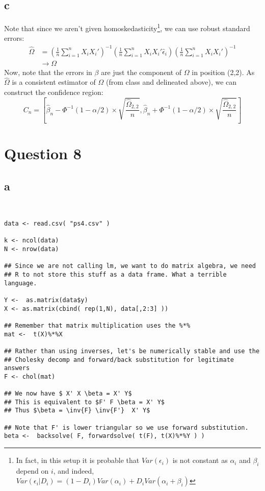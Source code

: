\documentclass[12pt]{paper}
\begin{document}
\subsection*{c}
Note that since we aren't given homoskedasticity\footnote{In fact, in this setup it is probable that $Var(\epsilon_i)$ is not constant as $\alpha_i$ and $\beta_i$ depend on $i$, and indeed, $Var(\epsilon_i|D_i) = (1-D_i)Var(\alpha_i) + D_iVar(\alpha_i + \beta_i)$}, we can use robust standard errors:
\begin{align*}
    \hat \Omega &= (\frac{1}{n}\sum_{i=1}^n X_i X_i')^{-1}(\frac{1}{n}\sum_{i=1}^n X_i X_i' \hat \epsilon_i)(\frac{1}{n}\sum_{i=1}^n X_i X_i')^{-1} \\
    & \rightarrow \Omega
\end{align*}
Now, note that the errors in $\beta$ are just the component of $\Omega$ in position (2,2). As $\hat \Omega$ is a consistent estimator of $\Omega$ (from class and delineated above), we can construct the confidence region:
$$C_n = [\hat \beta_n - \Phi^{-1}({1-\alpha/2})\times \sqrt{\frac{\hat \Omega_{2,2}}{n}}, \hat \beta_n +  \Phi^{-1}({1-\alpha/2})\times \sqrt{\frac{\hat \Omega_{2,2}}{n}}]  $$



\section*{Question 8}

\subsection*{a}

\begin{verbatim}


data <- read.csv( "ps4.csv" )

k <- ncol(data)
N <- nrow(data)

## Since we are not calling lm, we want to do matrix algebra, we need
## R to not store this stuff as a data frame. What a terrible language.

Y <-  as.matrix(data$y)
X <- as.matrix(cbind( rep(1,N), data[,2:3] ))

## Remember that matrix multiplication uses the %*%
mat <-  t(X)%*%X

## Rather than using inverses, let's be numerically stable and use the
## Cholesky decomp and forward/back substitution for legitimate answers
F <- chol(mat)

## We now have $ X' X \beta = X' Y$
## This is equivalent to $F' F \beta = X' Y$
## Thus $\beta = \inv{F} \inv{F'}  X' Y$

## Note that F' is lower triangular so we use forward substitution.
beta <-  backsolve( F, forwardsolve( t(F), t(X)%*%Y ) )

\end{verbatim}
\end{document}
